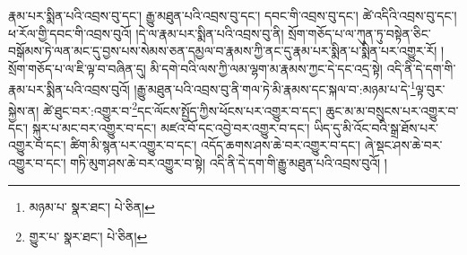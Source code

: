 རྣམ་པར་སྨིན་པའི་འབྲས་བུ་དང་། རྒྱུ་མཐུན་པའི་འབྲས་བུ་དང་། དབང་གི་འབྲས་བུ་དང་། ཚེ་འདིའི་འབྲས་བུ་དང་། ཕ་རོལ་གྱི་དབང་གི་འབྲས་བུའོ། །དེ་ལ་རྣམ་པར་སྨིན་པའི་འབྲས་བུ་ནི། སྲོག་གཅོད་པ་ལ་ཀུན་ཏུ་བསྟེན་ཅིང་བསྒོམས་ཏེ་ལན་མང་དུ་བྱས་པས་སེམས་ཅན་དམྱལ་བ་རྣམས་ཀྱི་ནང་དུ་རྣམ་པར་སྨིན་པ་སྨིན་པར་འགྱུར་རོ། །སྲོག་གཅོད་པ་ལ་ཇི་ལྟ་བ་བཞིན་དུ། མི་དགེ་བའི་ལས་ཀྱི་ལམ་ལྷག་མ་རྣམས་ཀྱང་དེ་དང་འདྲ་སྟེ། འདི་ནི་དེ་དག་གི་རྣམ་པར་སྨིན་པའི་འབྲས་བུའོ། །རྒྱུ་མཐུན་པའི་འབྲས་བུ་ནི་གལ་ཏེ་མི་རྣམས་དང་སྐལ་བ་:མཉམ་པ་དེ་\footnote{མཉམ་པ་  སྣར་ཐང་།  པེ་ཅིན། }ལྟ་བུར་སྐྱེས་ན། ཚེ་ཐུང་བར་:འགྱུར་བ་\footnote{གྱུར་པ་  སྣར་ཐང་།  པེ་ཅིན། }དང་ལོངས་སྤྱོད་ཀྱིས་ཕོངས་པར་འགྱུར་བ་དང་། ཆུང་མ་མ་བསྲུངས་པར་འགྱུར་བ་དང་། སྐུར་པ་མང་བར་འགྱུར་བ་དང་། མཛའ་བོ་དང་འབྱེ་བར་འགྱུར་བ་དང་། ཡིད་དུ་མི་འོང་བའི་སྒྲ་ཐོས་པར་འགྱུར་བ་དང་། ཚིག་མི་སྙན་པར་འགྱུར་བ་དང་། འདོད་ཆགས་ཤས་ཆེ་བར་འགྱུར་བ་དང་། ཞེ་སྡང་ཤས་ཆེ་བར་འགྱུར་བ་དང་། གཏི་མུག་ཤས་ཆེ་བར་འགྱུར་བ་སྟེ། འདི་ནི་དེ་དག་གི་རྒྱུ་མཐུན་པའི་འབྲས་བུའོ། །
